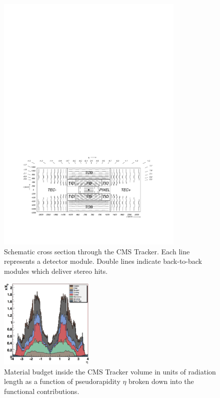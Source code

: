\documentclass[a4paper]{jpconf}
\begin{document}
\begin{figure}[h!]
  \begin{center}
    \includegraphics[width=0.8\textwidth]{fig/general_layout.pdf}
    \caption{Schematic cross section through the CMS Tracker. Each line represents a detector module. Double lines indicate back-to-back modules which deliver stereo hits.}
    \label{fig:tklayout}
  \end{center}
\end{figure}

\begin{figure}[h!]
  \begin{center}
    \includegraphics[width=0.4\textwidth]{fig/trackerMaterialbudget.png}
    \caption{Material budget inside the CMS Tracker volume in units of radiation length as a function of pseudorapidity $\eta$ broken down into the functional contributions.}
    \label{fig:tkmaterial}
  \end{center}
\end{figure}
\end{document}
